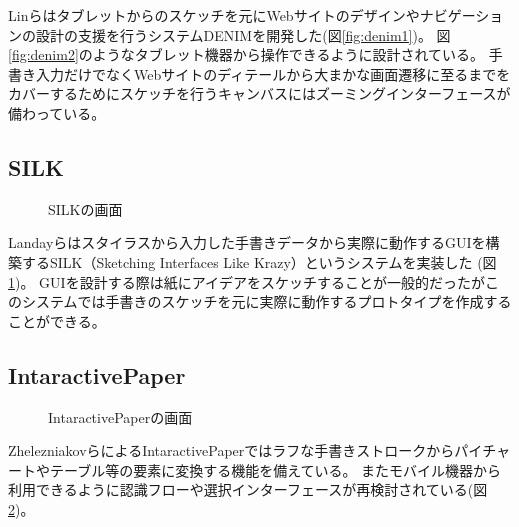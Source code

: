 Linらはタブレットからのスケッチを元にWebサイトのデザインやナビゲーションの設計の支援を行うシステムDENIMを開発した\cite{Lin2000DENIMFA}(図\ref{fig:denim1})。
図\ref{fig:denim2}のようなタブレット機器から操作できるように設計されている。
手書き入力だけでなくWebサイトのディテールから大まかな画面遷移に至るまでをカバーするためにスケッチを行うキャンバスにはズーミングインターフェースが備わっている。


\subsection{SILK}

\begin{figure}[H]
    \centering
    \caption{SILKの画面}
    \label{fig:silk}
\end{figure}

Landayらはスタイラスから入力した手書きデータから実際に動作するGUIを構築するSILK（Sketching Interfaces Like Krazy）というシステムを実装した
\cite{Landay2001SketchingIT}(図\ref{fig:silk})。
GUIを設計する際は紙にアイデアをスケッチすることが一般的だったがこのシステムでは手書きのスケッチを元に実際に動作するプロトタイプを作成することができる。

\subsection{IntaractivePaper}
\begin{figure}[H]
    \centering
    \caption{IntaractivePaperの画面}
    \label{fig:intaractivepaper}
\end{figure}
ZhelezniakovらによるIntaractivePaper\cite{Zhelezniakov2019InteractivePaperMI}ではラフな手書きストロークからパイチャートやテーブル等の要素に変換する機能を備えている。
またモバイル機器から利用できるように認識フローや選択インターフェースが再検討されている(図\ref{fig:intaractivepaper})。

